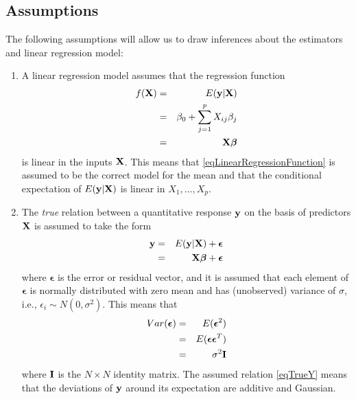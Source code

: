 \documentclass[11pt]{article}
\theoremstyle{remark}
\begin{document}
\subsection{Assumptions}
The following assumptions will allow us to draw inferences about the estimators and linear regression model:
\begin{enumerate}
\item A linear regression model assumes that the regression function
\begin{eqnarray}
f(\bold{X}) &=& E(\bold{y}|\bold{X})\nonumber\\
&=& \beta_0 + \sum_{j=1}^p X_{ij}\beta_j\nonumber\\
&=& \bold{X}\boldsymbol{\beta}\label{eqLinearRegressionFunction}
\end{eqnarray}
is linear in the inputs $\bold{X}$. This means that \eqref{eqLinearRegressionFunction} is assumed to be the correct model for the mean and that the conditional expectation of $E(\bold{y}|\bold{X})$ is linear in $X_1,\hdots,X_p$.
\item The \emph{true} relation between a quantitative response $\bold{y}$ on the basis of predictors $\bold{X}$ is assumed to take the form
\begin{eqnarray}
\bold{y} &=& E(\bold{y}|\bold{X}) + \boldsymbol{\epsilon}\nonumber\\
&=& \bold{X}\boldsymbol{\beta} + \boldsymbol{\epsilon}\label{eqTrueY}
\end{eqnarray}
where $\boldsymbol{\epsilon}$ is the error or residual vector, and it is assumed that each element of $\boldsymbol{\epsilon}$ is normally distributed with zero mean and has (unobserved) variance of $\sigma$, i.e., $\epsilon_i \sim N(0,\sigma^2)$. This means that
\begin{eqnarray}
Var(\boldsymbol{\epsilon}) &=& E(\boldsymbol{\epsilon}^2)\nonumber\\
&=& E(\boldsymbol{\epsilon}\boldsymbol{\epsilon}^T)\nonumber\\
&=& \sigma^2\bold{I}\label{VarError}
\end{eqnarray}
where $\bold{I}$ is the $N \times N$ identity matrix. The assumed relation \eqref{eqTrueY} means that the deviations of $\bold{y}$ around its expectation are additive and Gaussian.
\end{enumerate}
\end{document}
